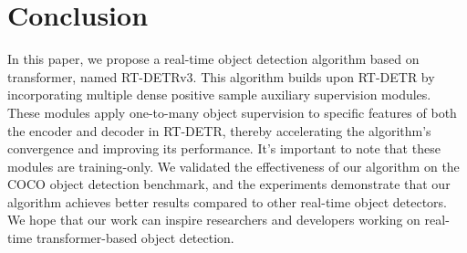 \documentclass[10pt,twocolumn,letterpaper]{article}
\begin{document}



\section{Conclusion}

In this paper, we propose a real-time object detection algorithm based on transformer, named RT-DETRv3. This algorithm builds upon RT-DETR by incorporating multiple dense positive sample auxiliary supervision modules. These modules apply one-to-many object supervision to specific features of both the encoder and decoder in RT-DETR, thereby accelerating the algorithm's convergence and improving its performance. It's important to note that these modules are training-only. We validated the effectiveness of our algorithm on the COCO object detection benchmark, and the experiments demonstrate that our algorithm achieves better results compared to other real-time object detectors. We hope that our work can inspire researchers and developers working on real-time transformer-based object detection.




\end{document}
